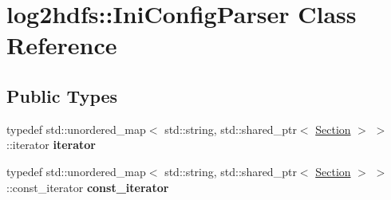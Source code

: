 \hypertarget{classlog2hdfs_1_1IniConfigParser}{}\section{log2hdfs\+:\+:Ini\+Config\+Parser Class Reference}
\label{classlog2hdfs_1_1IniConfigParser}
\subsection*{Public Types}
\begin{DoxyCompactItemize}
\item 
typedef std\+::unordered\+\_\+map$<$ std\+::string, std\+::shared\+\_\+ptr$<$ \hyperlink{classlog2hdfs_1_1Section}{Section} $>$ $>$\+::iterator {\bfseries iterator}\hypertarget{classlog2hdfs_1_1IniConfigParser_aa9fda92b7dac941dd1b5ebb92eba684f}{}\label{classlog2hdfs_1_1IniConfigParser_aa9fda92b7dac941dd1b5ebb92eba684f}

\item 
typedef std\+::unordered\+\_\+map$<$ std\+::string, std\+::shared\+\_\+ptr$<$ \hyperlink{classlog2hdfs_1_1Section}{Section} $>$ $>$\+::const\+\_\+iterator {\bfseries const\+\_\+iterator}\hypertarget{classlog2hdfs_1_1IniConfigParser_ab4bb963379b16f07f5704ed0df15ec95}{}\label{classlog2hdfs_1_1IniConfigParser_ab4bb963379b16f07f5704ed0df15ec95}

\end{DoxyCompactItemize}
